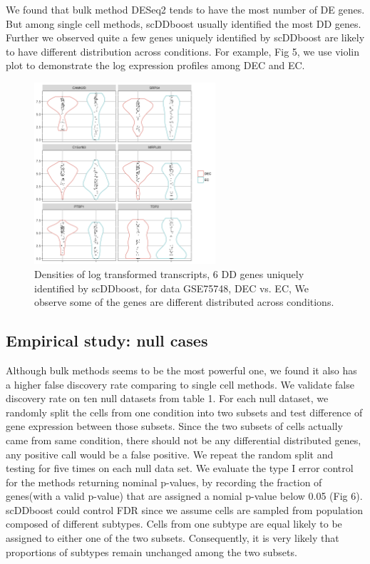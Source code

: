 \documentclass[aoas,preprint]{imsart}
\begin{document}
We found that bulk method DESeq2 tends to have the most number of DE genes. But among single cell methods, scDDboost usually identified the most DD genes. Further we observed quite a few genes uniquely identified by scDDboost are likely to have different distribution across conditions. For example, Fig 5, we use violin plot to demonstrate the log expression profiles among DEC and EC. \\
\begin{figure}[H]
\includegraphics[width = 0.6\textwidth]{Figs/density_DEC_dd.png}
 \caption{ Densities of log transformed transcripts, 6 DD genes uniquely identified by scDDboost, for data GSE75748, DEC vs. EC, We observe some of the genes are different distributed across conditions.}
  \label{fig:6}
\end{figure}

\subsection{Empirical study: null cases}
Although bulk methods seems to be the most powerful one, we found it also has a higher false discovery rate comparing to single cell methods. We validate false discovery rate on ten null datasets from table 1. For each null dataset, we randomly split the cells from one condition into two subsets and test difference of gene expression between those subsets. Since the two subsets of cells actually came from same condition, there should not be any differential distributed genes, any positive call would be a false positive. We repeat the random split and testing for five times on each null data set. We evaluate the type I error control for the methods returning nominal p-values, by recording the fraction of genes(with a valid p-value) that are assigned a nomial p-value below 0.05 (Fig 6).\\
scDDboost could control FDR since we assume cells are sampled from population composed of different subtypes. Cells from one subtype are equal likely to be assigned to either one of the two subsets. Consequently, it is very likely that proportions of subtypes remain unchanged among the two subsets.
\end{document}
